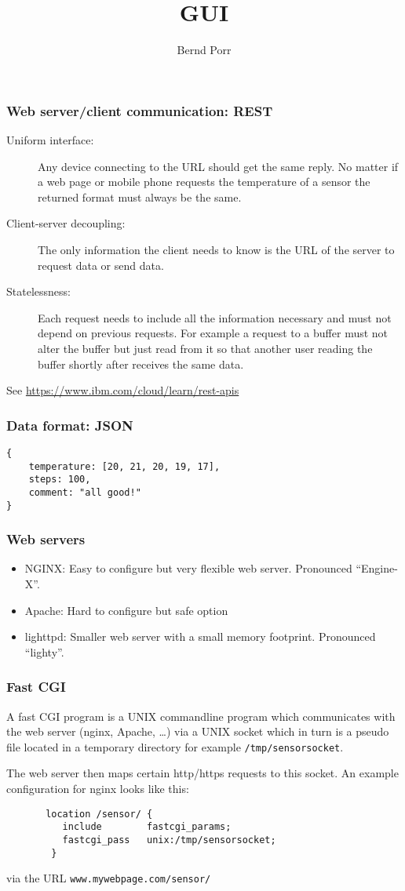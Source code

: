 \documentclass[xcolor=dvipsnames]{beamer}
\date{}
\title{GUI}
\author{Bernd Porr}
\begin{document}
\begin{frame}
\titlepage
\end{frame}




\begin{frame}[fragile]
  \frametitle{Web server/client communication: REST}
\begin{description}
\item[Uniform interface:] Any device connecting to the URL should
  get the same reply. No matter if a web page or mobile phone
  requests the temperature of a sensor the returned format must always be the same.
\item[Client-server decoupling:] The only information
  the client needs to know is the URL of the server to request data or send data.
\item[Statelessness:] Each request needs to include all the
  information necessary and must not depend on previous requests. For
  example a request to a buffer must not alter the
  buffer but just read from it so that another user reading the buffer
  shortly after receives the same data.
\end{description}
See \url{https://www.ibm.com/cloud/learn/rest-apis}
\end{frame}



\begin{frame}[fragile]
  \frametitle{Data format: JSON}

\begin{verbatim}
{
    temperature: [20, 21, 20, 19, 17],
    steps: 100,
    comment: "all good!"
}
\end{verbatim}
\end{frame}

\begin{frame}[fragile]
  \frametitle{Web servers}
\begin{itemize}
  \item NGINX: Easy to configure but very flexible web server. Pronounced ``Engine-X''.
  \item Apache: Hard to configure but safe option
  \item lighttpd: Smaller web server with a small memory footprint. Pronounced ``lighty''.
\end{itemize}
\end{frame}


\begin{frame}[fragile]
  \frametitle{Fast CGI}
A fast CGI program is a UNIX commandline program which communicates with the web server
(nginx, Apache, \ldots) via a UNIX socket which in turn is a pseudo file located
in a temporary directory for example \texttt{/tmp/sensorsocket}.

The web server then maps certain http/https requests to
this socket. An example configuration for nginx looks like this:
\begin{verbatim}
       location /sensor/ {
          include        fastcgi_params;
          fastcgi_pass   unix:/tmp/sensorsocket;
        }
\end{verbatim}
via the URL \texttt{www.mywebpage.com/sensor/}
\end{frame}
\end{document}

